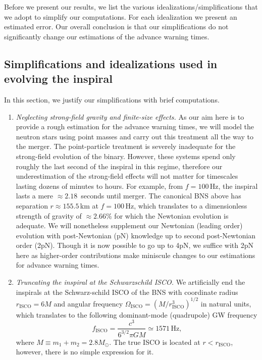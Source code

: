 \documentclass[11pt,a4paper]{article}
\newcommand{\f}{\frac}
\newcommand{\be}{\begin{equation}}
\newcommand{\ee}{\end{equation}}
\begin{document}
Before we present our results, we list the various idealizations/simplifications that we adopt to simplify our computations.
For each idealization we present an estimated error. %
Our overall conclusion is that our simplifications do not significantly change our estimations of the advance warning times.%
%
%
%
%
\subsection{Simplifications and idealizations used in evolving the inspiral}\label{sec:idealizations}
In this section, we justify our simplifications with brief computations.
\begin{enumerate}
 \item {\it Neglecting strong-field gravity and finite-size effects.}
As our aim here is to provide a rough estimation for the advance warning times, we will model the neutron stars using point masses and carry out this treatment all the way to the merger. The point-particle treatment is severely inadequate for the strong-field evolution of the binary. However, these systems spend only roughly the last second of the inspiral in this regime, therefore our underestimation of the strong-field effects will not matter for timescales lasting dozens of minutes to hours.
For example, from $f=100\,$Hz, the inspiral lasts a mere $\approx 2.18\,$ seconds until merger. The canonical BNS above has separation $r\approx 155.5\,$km at $f=100\,$Hz, which translates to a dimensionless strength of gravity of $\approx 2.66\%$ for which the Newtonian evolution is adequate.
We will nonetheless supplement our Newtonian (leading order) evolution with post-Newtonian (pN) knowledge up to second post-Newtonian order (2pN). %
Though it is now possible to go up to 4pN, we suffice with 2pN here as higher-order contributions make miniscule changes to our estimations for advance warning times. 
%
\item {\it Truncating the inspiral at the Schwarzschild ISCO.}
We artificially end the inspirals at the Schwarz-schild ISCO of the BNS with coordinate radius $r_\text{ISCO} = 6M$ and angular frequency $\Omega_\text{ISCO} = (M/r^3_\text{ISCO})^{1/2}$ in natural units, which translates to the following dominant-mode (quadrupole) GW frequency
\be
f_\text{ISCO} = \f{c^3}{6^{3/2}\pi G M} \simeq 1571\,\text{Hz} \label{eq:f_isco},
\ee
where $M \equiv m_1+m_2 = 2.8 M_\odot$. The true ISCO is located at $r< r_\text{ISCO}$, however, there is no simple expression for it.

\end{enumerate}
\end{document}
